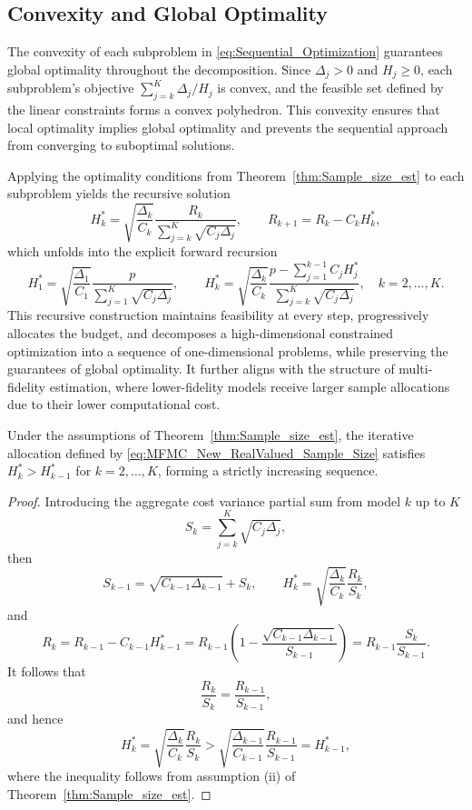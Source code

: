 \subsection{Convexity and Global Optimality}
The convexity of each subproblem in \eqref{eq:Sequential_Optimization} guarantees global optimality throughout the decomposition. Since $\Delta_j > 0$ and $H_j \ge 0$, each subproblem's objective $\sum_{j=k}^K \Delta_j/H_j$ is convex, and the feasible set defined by the linear constraints forms a convex polyhedron. This convexity ensures that local optimality implies global optimality and prevents the sequential approach from converging to suboptimal solutions. 

Applying the optimality conditions from Theorem~\ref{thm:Sample_size_est} to each subproblem yields the recursive solution
%
\begin{equation*}
    H_k^* = \sqrt{\frac{\Delta_k}{C_k}} \frac{R_k}{\sum_{j=k}^K\sqrt{C_j\Delta_j}},
    \qquad 
    R_{k+1} = R_k - C_k H_k^*,
\end{equation*}
%
which unfolds into the explicit forward recursion
%
\begin{equation}\label{eq:MFMC_New_RealValued_Sample_Size}
    H_1^* = \sqrt{\frac{\Delta_1}{C_1}} \frac{p}{\sum_{j=1}^K\sqrt{C_j\Delta_j}}, 
    \qquad 
    H_k^* = \sqrt{\frac{\Delta_k}{C_k}} \frac{p-\sum_{j=1}^{k-1}C_jH_j^*}{\sum_{j=k}^K\sqrt{C_j\Delta_j}}, 
    \quad k = 2,\ldots, K.
\end{equation}
%
This recursive construction maintains feasibility at every step, progressively allocates the budget, and decomposes a high-dimensional constrained optimization into a sequence of one-dimensional problems, while preserving the guarantees of global optimality. It further aligns with the structure of multi-fidelity estimation, where lower-fidelity models receive larger sample allocations due to their lower computational cost.
%
\begin{theorem}
\label{thm:Monotonicity_H_k}
Under the assumptions of Theorem~\ref{thm:Sample_size_est}, the iterative allocation defined by \eqref{eq:MFMC_New_RealValued_Sample_Size} satisfies $H_k^* > H_{k-1}^*$ for $k=2,\ldots,K$, forming a strictly increasing sequence.
\end{theorem}
%
\begin{proof}
Introducing the aggregate cost variance partial sum from model $k$ up to $K$
%
\begin{equation}\label{eq:aggregate_cost_variance_weight_Sk}
    S_k=\sum_{j=k}^K\sqrt{C_j\Delta_j},
\end{equation}
%
then 
\[
S_{k-1}=\sqrt{C_{k-1}\Delta_{k-1}}+S_k, \qquad H_k^* = \sqrt{\frac{\Delta_k}{C_k}}\frac{R_k}{S_k},
\]
%
and
\begin{equation*}
R_k = R_{k-1} - C_{k-1}H_{k-1}^* = R_{k-1}\left(1 - \frac{\sqrt{C_{k-1}\Delta_{k-1}}}{S_{k-1}}\right) = R_{k-1}\frac{S_k}{S_{k-1}}.
\end{equation*}
It follows that 
\[
\frac{R_k}{S_k} = \frac{R_{k-1}}{S_{k-1}},
\]
and hence
\[
H_k^*=\sqrt{\frac{\Delta_k}{C_k}}\frac{R_k}{S_k}
> \sqrt{\frac{\Delta_{k-1}}{C_{k-1}}}\frac{R_{k-1}}{S_{k-1}}
=H_{k-1}^*,
\]
where the inequality follows from assumption (ii) of Theorem~\ref{thm:Sample_size_est}.
\end{proof}
